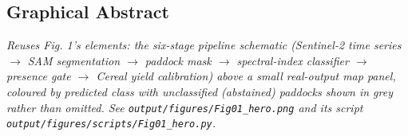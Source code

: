 \subsection{Graphical Abstract}\label{graphical-abstract}

\emph{Reuses Fig. 1's elements: the six-stage pipeline schematic (Sentinel-2 time series $\rightarrow$ SAM
segmentation $\rightarrow$ paddock mask $\rightarrow$ spectral-index classifier $\rightarrow$ presence gate $\rightarrow$ Cereal yield
calibration) above a small real-output map panel, coloured by predicted class with
unclassified (abstained) paddocks shown in grey rather than omitted. See
\texttt{output/figures/Fig01\_hero.png} and its script \texttt{output/figures/scripts/Fig01\_hero.py}.}

